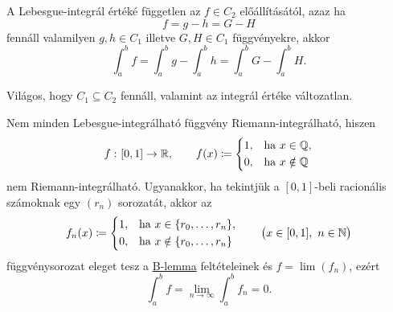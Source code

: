 \documentclass[
]{elteikthesis}[2024/04/26]
\begin{document}
	\begin{notes}
		\item
		A Lebesgue-integrál értéké független az \( f \in C_2 \) előállításától, azaz ha
		\[
			f = g - h = G - H
		\]
		fennáll valamilyen \( g,h \in C_1 \) illetve \( G,H \in C_1 \) függvényekre, akkor
		\[
			\int_a^b f =
			\int_a^b g - \int_a^b h =
			\int_a^b G - \int_a^b H.
		\]
		
		\item 
		Világos, hogy \( C_1 \subseteq C_2 \) fennáll, 
		valamint az integrál értéke változatlan.
		
		\item
		Nem minden Lebesgue-integrálható függvény Riemann-integrálható, hiszen
		\[
			f \,\colon [0, 1] \to \mathbb{R}, \qquad
			f(x) \coloneq
			\left\{
			\begin{aligned}
				1, & \quad \text{ha } x \in \mathbb{Q}, \\
				0, & \quad \text{ha } x \notin \mathbb{Q}
			\end{aligned}
			\right.
		\]
		nem Riemann-integrálható.
		Ugyanakkor, 
		ha tekintjük a \( [0, 1] \)-beli racionális számoknak egy \( (r_n) \) sorozatát, 
		akkor az
		\[
			f_n(x) \coloneq
			\left\{
			\begin{aligned}
				1, & \quad \text{ha } x \in \{ r_0, \dots, r_n \}, \\
				0, & \quad \text{ha } x \notin \{ r_0, \dots, r_n \}
			\end{aligned}
			\right.
			\qquad \bigl( x \in [0, 1], \ n \in \mathbb{N} \bigr)
		\]
		függvénysorozat eleget tesz a \hyperref[lem:riesz-b]{B-lemma} feltételeinek és
		\( f = \lim(f_n) \), ezért
		\[
			\int_a^b f = \lim_{n \to \infty} \int_a^b f_n = 0.
		\]
	\end{notes}
	
\end{document}
